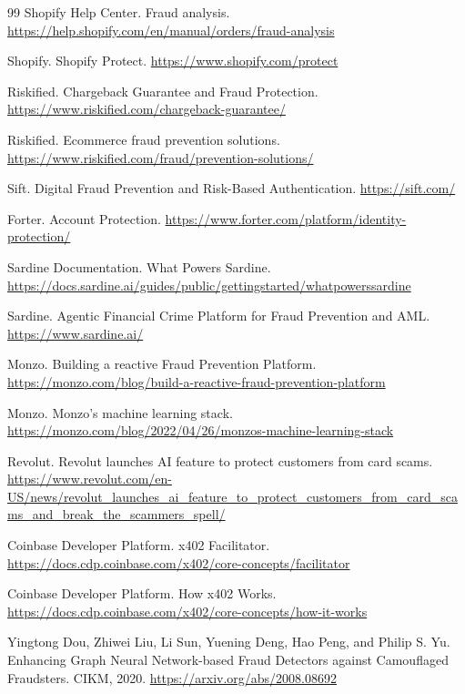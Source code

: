 \documentclass[11pt]{article}
\begin{document}
\begin{thebibliography}{99}
Shopify Help Center.
\newblock Fraud analysis.
\newblock \url{https://help.shopify.com/en/manual/orders/fraud-analysis}

Shopify.
\newblock Shopify Protect.
\newblock \url{https://www.shopify.com/protect}

Riskified.
\newblock Chargeback Guarantee and Fraud Protection.
\newblock \url{https://www.riskified.com/chargeback-guarantee/}

Riskified.
\newblock Ecommerce fraud prevention solutions.
\newblock \url{https://www.riskified.com/fraud/prevention-solutions/}

Sift.
\newblock Digital Fraud Prevention and Risk-Based Authentication.
\newblock \url{https://sift.com/}

Forter.
\newblock Account Protection.
\newblock \url{https://www.forter.com/platform/identity-protection/}

Sardine Documentation.
\newblock What Powers Sardine.
\newblock \url{https://docs.sardine.ai/guides/public/gettingstarted/whatpowerssardine}

Sardine.
\newblock Agentic Financial Crime Platform for Fraud Prevention and AML.
\newblock \url{https://www.sardine.ai/}

Monzo.
\newblock Building a reactive Fraud Prevention Platform.
\newblock \url{https://monzo.com/blog/build-a-reactive-fraud-prevention-platform}

Monzo.
\newblock Monzo's machine learning stack.
\newblock \url{https://monzo.com/blog/2022/04/26/monzos-machine-learning-stack}

Revolut.
\newblock Revolut launches AI feature to protect customers from card scams.
\newblock \url{https://www.revolut.com/en-US/news/revolut_launches_ai_feature_to_protect_customers_from_card_scams_and_break_the_scammers_spell/}

Coinbase Developer Platform.
\newblock x402 Facilitator.
\newblock \url{https://docs.cdp.coinbase.com/x402/core-concepts/facilitator}

Coinbase Developer Platform.
\newblock How x402 Works.
\newblock \url{https://docs.cdp.coinbase.com/x402/core-concepts/how-it-works}

Yingtong Dou, Zhiwei Liu, Li Sun, Yuening Deng, Hao Peng, and Philip S. Yu.
\newblock Enhancing Graph Neural Network-based Fraud Detectors against Camouflaged Fraudsters.
\newblock CIKM, 2020.
\newblock \url{https://arxiv.org/abs/2008.08692}


\end{thebibliography}
\end{document}

